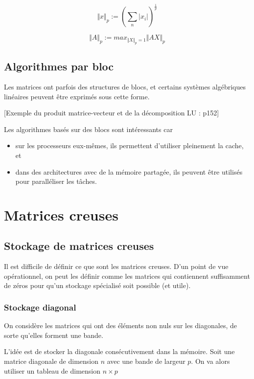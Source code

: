 	$$\Vert x \Vert_p := (\sum_n \vert x_i \vert)^{\frac{1}{p}}$$
	
	$$\Vert A \Vert_p := max_{\Vert X \Vert_p = 1} \Vert A X \Vert_p$$
	
	\subsection{Algorithmes par bloc}
	
	Les matrices ont parfois des structures de blocs, et certains systèmes algébriques linéaires peuvent être exprimés sous cette forme.
	
	[Exemple du produit matrice-vecteur et de la décomposition LU : p152]
	
	Les algorithmes basés sur des blocs sont intéressants car
	
	\begin{itemize}
		\item sur les processeurs eux-mêmes, ils permettent d'utiliser pleinement la cache, et
		\item dans des architectures avec de la mémoire partagée, ils peuvent être utilisés pour paralléliser les tâches.
	\end{itemize}
	
\section{Matrices creuses}

	\subsection{Stockage de matrices creuses}
	
	Il est difficile de définir ce que sont les matrices creuses. D'un point de vue opérationnel, on peut les définir comme les matrices qui contiennent suffisamment de zéros pour qu'un stockage spécialisé soit possible (et utile).
	
		\subsubsection{Stockage diagonal}
		
		On considère les matrices qui ont des éléments non nuls sur les diagonales, de sorte qu'elles forment une bande.
		
		L'idée est de stocker la diagonale consécutivement dans la mémoire. Soit une matrice diagonale de dimension $n$ avec une bande de largeur $p$. On va alors utiliser un tableau de dimension $n \times p$
		
